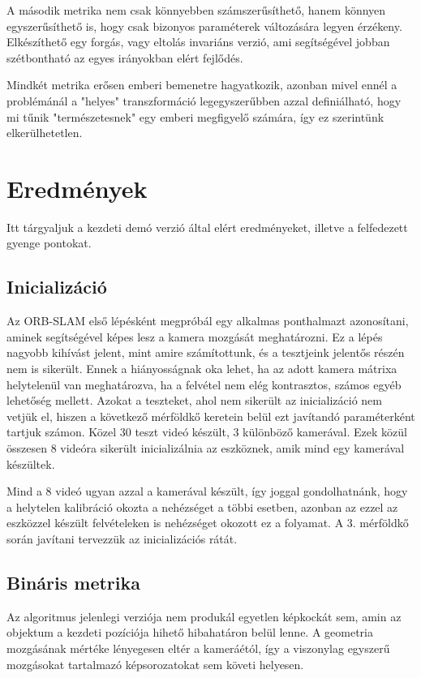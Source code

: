 A második metrika nem csak könnyebben számszerűsíthető, hanem könnyen egyszerűsíthető is, hogy csak bizonyos paraméterek változására legyen érzékeny.
Elkészíthető egy forgás, vagy eltolás invariáns verzió, ami segítségével jobban szétbontható az egyes irányokban elért fejlődés.

Mindkét metrika erősen emberi bemenetre hagyatkozik, azonban mivel ennél a problémánál a "helyes" transzformáció legegyszerűbben azzal definiálható, hogy mi tűnik "természetesnek" egy emberi megfigyelő számára, így ez szerintünk elkerülhetetlen.

\section{Eredmények}

Itt tárgyaljuk a kezdeti demó verzió által elért eredményeket, illetve a felfedezett gyenge pontokat.

\subsection{Inicializáció}

Az ORB-SLAM első lépésként megpróbál egy alkalmas ponthalmazt azonosítani, aminek segítségével képes lesz a kamera mozgását meghatározni.
Ez a lépés nagyobb kihívást jelent, mint amire számítottunk, és a tesztjeink jelentős részén nem is sikerült.
Ennek a hiányosságnak oka lehet, ha az adott kamera mátrixa helytelenül van meghatározva, ha a felvétel nem elég kontrasztos, számos egyéb lehetőség mellett.
Azokat a teszteket, ahol nem sikerült az inicializáció nem vetjük el, hiszen a következő mérföldkő keretein belül ezt javítandó paraméterként tartjuk számon.
Közel 30 teszt videó készült, 3 különböző kamerával.
Ezek közül összesen 8 videóra sikerült inicializálnia az eszköznek, amik mind egy kamerával készültek.

Mind a 8 videó ugyan azzal a kamerával készült, így joggal gondolhatnánk, hogy a helytelen kalibráció okozta a nehézséget a többi esetben, azonban az ezzel az eszközzel készült felvételeken is nehézséget okozott ez a folyamat.
A 3. mérföldkő során javítani tervezzük az inicializációs rátát.

\subsection{Bináris metrika}

Az algoritmus jelenlegi verziója nem produkál egyetlen képkockát sem, amin az objektum a kezdeti pozíciója hihető hibahatáron belül lenne.
A geometria mozgásának mértéke lényegesen eltér a kameráétól, így a viszonylag egyszerű mozgásokat tartalmazó képsorozatokat sem követi helyesen.

